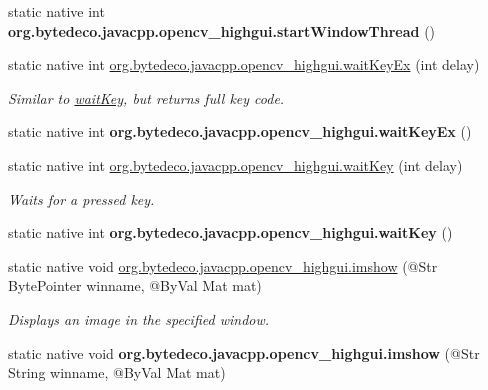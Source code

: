 \begin{DoxyCompactItemize}
\mbox{\label{group__highgui_ga9aa287f051c0090aefba35969af09464}} 
static native int {\bfseries org.\+bytedeco.\+javacpp.\+opencv\+\_\+highgui.\+start\+Window\+Thread} ()
\item 
static native int \hyperlink{group__highgui_ga6a23d9d2816fcc0c96c3445b5969f5ac}{org.\+bytedeco.\+javacpp.\+opencv\+\_\+highgui.\+wait\+Key\+Ex} (int delay)
\begin{DoxyCompactList}\small\item\em Similar to \hyperlink{group__highgui_gaf924607bac022bb3603e459e3f2f3239}{wait\+Key}, but returns full key code. \end{DoxyCompactList}\item 
\mbox{\label{group__highgui_ga309b6a92c0ee657dcee70e5b3d8b082a}} 
static native int {\bfseries org.\+bytedeco.\+javacpp.\+opencv\+\_\+highgui.\+wait\+Key\+Ex} ()
\item 
static native int \hyperlink{group__highgui_gaf924607bac022bb3603e459e3f2f3239}{org.\+bytedeco.\+javacpp.\+opencv\+\_\+highgui.\+wait\+Key} (int delay)
\begin{DoxyCompactList}\small\item\em Waits for a pressed key. \end{DoxyCompactList}\item 
\mbox{\label{group__highgui_gad7a6623c0d3aa6fcca43fc0685f708a4}} 
static native int {\bfseries org.\+bytedeco.\+javacpp.\+opencv\+\_\+highgui.\+wait\+Key} ()
\item 
static native void \hyperlink{group__highgui_gaf05d46739d8a87edb7405e79c7207975}{org.\+bytedeco.\+javacpp.\+opencv\+\_\+highgui.\+imshow} (@Str Byte\+Pointer winname, @By\+Val Mat mat)
\begin{DoxyCompactList}\small\item\em Displays an image in the specified window. \end{DoxyCompactList}\item 
\mbox{\label{group__highgui_gac5b1ce207244bb6bb126e0777819f709}} 
static native void {\bfseries org.\+bytedeco.\+javacpp.\+opencv\+\_\+highgui.\+imshow} (@Str String winname, @By\+Val Mat mat)
\item 
\mbox{\label{group__highgui_ga3c9916bae38bb1e210a631929ba26cce}} 

\end{DoxyCompactItemize}
